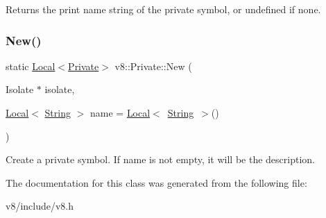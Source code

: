 Returns the print name string of the private symbol, or undefined if none. \mbox{\label{classv8_1_1Private_ae43aa9516121ed7a24cf5bba1654b653}} 
\subsubsection{\texorpdfstring{New()}{New()}}
{\footnotesize\ttfamily static \mbox{\hyperlink{classv8_1_1Local}{Local}}$<$\mbox{\hyperlink{classv8_1_1Private}{Private}}$>$ v8\+::\+Private\+::\+New (\begin{DoxyParamCaption}\item[{Isolate $\ast$}]{isolate,  }\item[{\mbox{\hyperlink{classv8_1_1Local}{Local}}$<$ \mbox{\hyperlink{classv8_1_1String}{String}} $>$}]{name = {\ttfamily \mbox{\hyperlink{classv8_1_1Local}{Local}}$<$~\mbox{\hyperlink{classv8_1_1String}{String}}~$>$()} }\end{DoxyParamCaption})\hspace{0.3cm}{\ttfamily [static]}}

Create a private symbol. If name is not empty, it will be the description. 

The documentation for this class was generated from the following file\+:\begin{DoxyCompactItemize}
\item 
v8/include/v8.\+h\end{DoxyCompactItemize}
